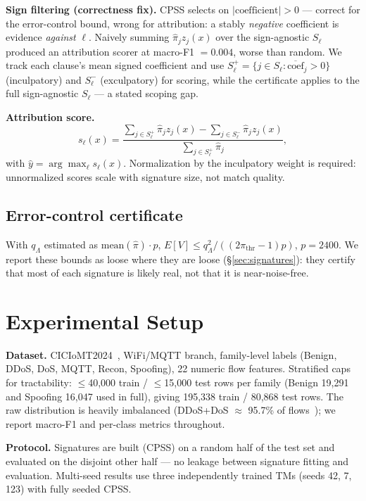 \documentclass[conference]{IEEEtran}
\begin{document}
\textbf{Sign filtering (correctness fix).} CPSS selects on
$|\text{coefficient}| > 0$ --- correct for the error-control bound, wrong
for attribution: a stably \emph{negative} coefficient is evidence
\emph{against} $\ell$. Naively summing $\hat{\pi}_j z_j(x)$ over the
sign-agnostic $S_\ell$ produced an attribution scorer at macro-F1 $= 0.004$,
worse than random. We track each clause's mean signed coefficient and use
$S_\ell^{+} = \{j \in S_\ell : \overline{\mathrm{coef}}_j > 0\}$
(inculpatory) and $S_\ell^{-}$ (exculpatory) for scoring, while the
certificate applies to the full sign-agnostic $S_\ell$ --- a stated scoping
gap.

\textbf{Attribution score.}
\begin{equation}
s_\ell(x) = \frac{\sum_{j \in S_\ell^{+}} \hat{\pi}_j z_j(x) - \sum_{j \in S_\ell^{-}} \hat{\pi}_j z_j(x)}{\sum_{j \in S_\ell^{+}} \hat{\pi}_j},
\end{equation}
with $\hat{y} = \arg\max_\ell s_\ell(x)$.
Normalization by the inculpatory weight is required: unnormalized scores
scale with signature size, not match quality.

\subsection{Error-control certificate}
With $q_\Lambda$ estimated as $\mathrm{mean}(\hat{\pi}) \cdot p$,
$E[V] \le q_\Lambda^2 / ((2\pi_{\mathrm{thr}} - 1) p)$, $p = 2400$. We
report these bounds as loose where they are loose (\S\ref{sec:signatures}):
they certify that most of each signature is likely real, not that it is
near-noise-free.

\section{Experimental Setup}
\textbf{Dataset.} CICIoMT2024~\cite{dadkhah2024}, WiFi/MQTT branch,
family-level labels (Benign, DDoS, DoS, MQTT, Recon, Spoofing), 22 numeric
flow features. Stratified caps for tractability: $\le$40{,}000 train /
$\le$15{,}000 test rows per family (Benign 19{,}291 and Spoofing 16{,}047
used in full), giving 195{,}338 train / 80{,}868 test rows. The raw
distribution is heavily imbalanced (DDoS+DoS $\approx$ 95.7\% of
flows~\cite{dadkhah2024}); we report macro-F1 and per-class metrics
throughout.

\textbf{Protocol.} Signatures are built (CPSS) on a random half of the test
set and evaluated on the disjoint other half --- no leakage between
signature fitting and evaluation. Multi-seed results use three independently
trained TMs (seeds 42, 7, 123) with fully seeded CPSS.
\end{document}
